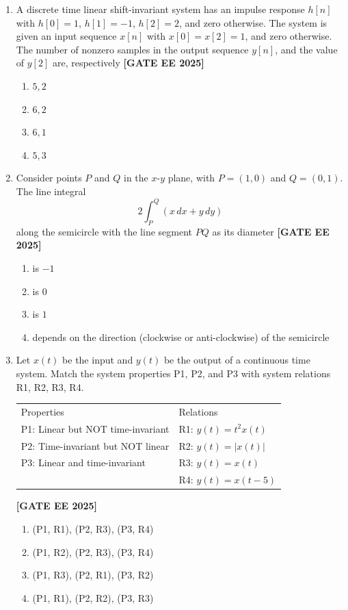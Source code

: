 \documentclass[12pt,a4paper]{article}
\begin{document}
\begin{enumerate}[leftmargin=*, label=\textbf{Q.\arabic*:}]
\item A discrete time linear shift-invariant system has an impulse response $h[n]$ with $h[0]=1$, $h[1]=-1$, $h[2]=2$, and zero otherwise. The system is given an input sequence $x[n]$ with $x[0]=x[2]=1$, and zero otherwise. The number of nonzero samples in the output sequence $y[n]$, and the value of $y[2]$ are, respectively
\newline
\noindent \textbf{[GATE EE 2025]}
\begin{enumerate}[label=(\Alph*)]
    \item $5, 2$
    \item $6, 2$
    \item $6, 1$
    \item $5, 3$
\end{enumerate}

\item Consider points $P$ and $Q$ in the $x$-$y$ plane, with $P = (1,0)$ and $Q = (0,1)$. The line integral
\[
2\int_P^Q (x\,dx + y\,dy)
\]
along the semicircle with the line segment $PQ$ as its diameter
\newline
\noindent \textbf{[GATE EE 2025]}
\begin{enumerate}[label=(\Alph*)]
  \item is $-1$
  \item is $0$
  \item is $1$
  \item depends on the direction (clockwise or anti-clockwise) of the semicircle
\end{enumerate}

\item Let $x(t)$ be the input and $y(t)$ be the output of a continuous time system. Match the system properties P1, P2, and P3 with system relations R1, R2, R3, R4.
\begin{center}
  \begin{tabular}{ll}
    Properties & Relations \\
    P1: Linear but NOT time-invariant              & R1: $y(t)=t^2 x(t) $ \\
    P2: Time-invariant but NOT linear              & R2: $y(t)=|x(t)| $ \\
    P3: Linear and time-invariant                  & R3: $y(t)=x(t)$ \\
                                                  & R4: $y(t)=x(t-5)$
  \end{tabular}
\end{center}
\newline
\noindent \textbf{[GATE EE 2025]}
\begin{enumerate}[label=(\Alph*)]
  \item (P1, R1), (P2, R3), (P3, R4)
  \item (P1, R2), (P2, R3), (P3, R4)
  \item (P1, R3), (P2, R1), (P3, R2)
  \item (P1, R1), (P2, R2), (P3, R3)
\end{enumerate}


\end{enumerate}
\end{document}
